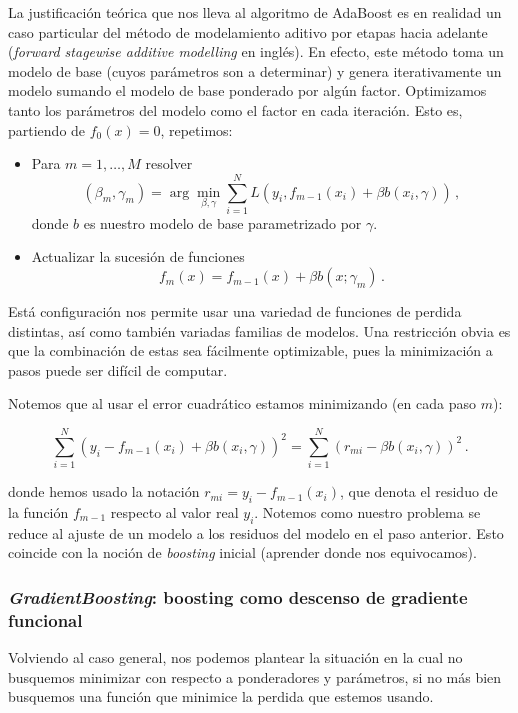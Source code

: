 La justificación teórica que nos lleva al algoritmo de AdaBoost es en realidad un caso particular del método de modelamiento aditivo por etapas hacia adelante (\textit{forward stagewise additive modelling} en inglés). En efecto, este método toma un modelo de base (cuyos parámetros son a determinar) y genera iterativamente un modelo sumando el modelo de base ponderado por algún factor. Optimizamos tanto los parámetros del modelo como el factor en cada iteración. Esto es, partiendo de $f_0(x) = 0$, repetimos:

\begin{itemize}
    \item Para $m = 1 , \dots, M$ resolver
    $$ (\beta_m,\gamma_m) = \arg\min_{\beta,\gamma} \sum^N_{i=1} L(y_i, f_{m-1}(x_i)+ \beta b(x_i,\gamma) ) \,,$$
    donde $b$ es nuestro modelo de base parametrizado por $\gamma$.

    \item Actualizar la sucesión de funciones
    $$ f_m(x) = f_{m-1}(x) + \beta b(x;\gamma_m) \,.$$
\end{itemize}

Está configuración nos permite usar una variedad de funciones de perdida distintas, así como también variadas familias de modelos. Una restricción obvia es que la combinación de estas sea fácilmente optimizable, pues la minimización a pasos puede ser difícil de computar.

Notemos que al usar el error cuadrático estamos minimizando
(en cada paso $m$):

$$ \sum^N_{i=1}(y_i - f_{m-1}(x_i)+ \beta b(x_i,\gamma))^2 = \sum^N_{i=1} (r_{mi}-\beta b(x_i,\gamma))^2 \,.$$

donde hemos usado la notación $r_{mi} = y_i - f_{m-1}(x_i)$, que denota el residuo de la función $f_{m-1}$ respecto al valor real $y_i$. Notemos como nuestro problema se reduce al ajuste de un modelo a los residuos del modelo en el paso anterior. Esto coincide con la noción de \textit{boosting} inicial (aprender donde nos equivocamos).


\subsubsection{\textit{GradientBoosting}: boosting como descenso de gradiente funcional}

Volviendo al caso general, nos podemos plantear la situación en la cual no busquemos minimizar con respecto a ponderadores y parámetros, si no más bien busquemos una función que minimice la perdida que estemos usando.

